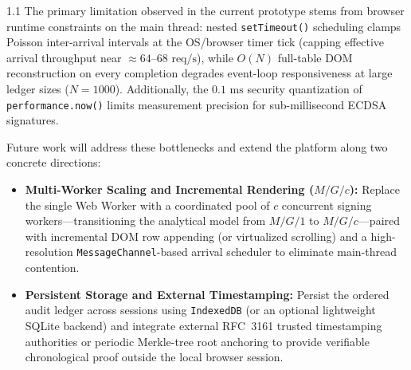 \documentclass[11pt,a4paper]{article}
\begin{document}
\begin{spacing}{1.1}
The primary limitation observed in the current prototype stems from browser runtime constraints on the main thread: nested \texttt{setTimeout()} scheduling clamps Poisson inter-arrival intervals at the OS/browser timer tick (capping effective arrival throughput near $\approx 64\text{--}68\text{ req/s}$), while $O(N)$ full-table DOM reconstruction on every completion degrades event-loop responsiveness at large ledger sizes ($N = 1000$). Additionally, the $0.1\text{ ms}$ security quantization of \texttt{performance.now()} limits measurement precision for sub-millisecond ECDSA signatures.

Future work will address these bottlenecks and extend the platform along two concrete directions:
\begin{itemize}
    \item \textbf{Multi-Worker Scaling and Incremental Rendering ($M/G/c$):} Replace the single Web Worker with a coordinated pool of $c$ concurrent signing workers---transitioning the analytical model from $M/G/1$ to $M/G/c$---paired with incremental DOM row appending (or virtualized scrolling) and a high-resolution \texttt{MessageChannel}-based arrival scheduler to eliminate main-thread contention.
    \item \textbf{Persistent Storage and External Timestamping:} Persist the ordered audit ledger across sessions using \texttt{IndexedDB} (or an optional lightweight SQLite backend) and integrate external RFC~3161 trusted timestamping authorities or periodic Merkle-tree root anchoring to provide verifiable chronological proof outside the local browser session.
\end{itemize}

\end{spacing}
\end{document}
